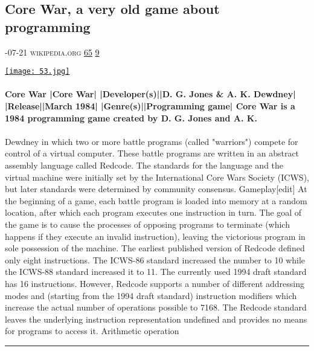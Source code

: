 \documentclass[10pt,a4paper]{article}
\begin{document}
\begin{multicols}{2}
\begin{minipage}{\linewidth}
\subsection{Core War, a very old game about programming}
\textsc{\footnotesize
{\scriptsize\faCalendar}-07-21 
{\scriptsize\faGlobe}\space 
wikipedia.org 
{\scriptsize\faThumbsOUp}\space 
\href{http://news.ycombinator.com/item?id=37117469\&utm\_term=comment}{65} 
{\scriptsize\faComments}\space 
\href{http://news.ycombinator.com/item?id=37117469\&utm\_term=comment}{9} 
}
\par\medskip\noindent
\href{https://en.wikipedia.org/wiki/Core\_War?utm\_source=hackernewsletter\&utm\_medium=email\&utm\_term=learn}{
    \texttt{[image: 53.jpg]}
}
\end{minipage}
\paragraph{}
\textbf{Core War
|Core War|
|Developer(s)||D. G. Jones \& A. K. Dewdney|
|Release||March 1984|
|Genre(s)||Programming game|
Core War is a 1984 programming game created by D. G. Jones and A. K.}
\paragraph{}
 Dewdney in which two or more battle programs (called "warriors") compete for control of a virtual computer. These battle programs are written in an abstract assembly language called Redcode. The standards for the language and the virtual machine were initially set by the International Core Wars Society (ICWS), but later standards were determined by community consensus.
Gameplay[edit]
At the beginning of a game, each battle program is loaded into memory at a random location, after which each program executes one instruction in turn. The goal of the game is to cause the processes of opposing programs to terminate (which happens if they execute an invalid instruction), leaving the victorious program in sole possession of the machine.
The earliest published version of Redcode defined only eight instructions. The ICWS-86 standard increased the number to 10 while the ICWS-88 standard increased it to 11. The currently used 1994 draft standard has 16 instructions. However, Redcode supports a number of different addressing modes and (starting from the 1994 draft standard) instruction modifiers which increase the actual number of operations possible to 7168. The Redcode standard leaves the underlying instruction representation undefined and provides no means for programs to access it. Arithmetic operation
\par\noindent\textcolor{red}{\rule{\linewidth}{0.2mm}}
\vfill
\null
\end{multicols}
\end{document}
